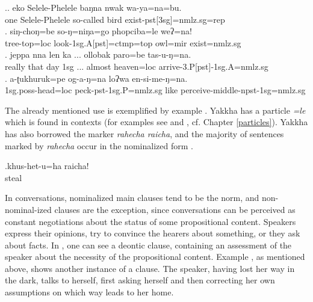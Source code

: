 \ex.\ag.  eko Selele-Phelele baŋna nwak wa-ya=na=bu.\\
one Selele-Phelele so-called bird exist{\sc -pst[3sg]=nmlz.sg=rep}\\
 
\bg. siŋ-choŋ=be        so-ŋ=niŋa=go              phopciba=le          weʔ=na!\\
tree-top{\sc =loc} look{\sc -1sg.A[pst]=ctmp=top} owl{\sc =mir} exist{\sc [3sg.npst]=nmlz.sg}\\
 
\bg. jeppa nna  len ka ... ollobak paro=be tas-u-ŋ=na.\\
really that day {\sc 1sg} ... almost heaven{\sc =loc} arrive{\sc -3.P[pst]-1sg.A=nmlz.sg}\\
 
\bg. a-ʈukhuruk=pe  og-a-ŋ=na loʔwa en-si-me-ŋ=na.\\
{\sc 1sg.poss-}head{\sc =loc} peck{\sc -pst-1sg.P=nmlz.sg} like perceive{\sc -middle-npst-1sg=nmlz.sg}\\
 


The already mentioned  use is exemplified by example \Next. Yakkha has a  particle \emph{=le} which is found in  contexts (for  examples see \Last[b] and \NNext[b], cf. Chapter \ref{particles}). Yakkha has also borrowed the   marker \emph{rahecha \ti raicha}, and the  majority of sentences marked by \emph{rahecha} occur in the nominalized form \Next.


\exg.khus-het-u=ha   raicha!\\
steal  \\
 


In conversations, nominalized main clauses tend to be  the norm, and non-nominal-ized clauses are the exception, since conversations can be perceived as constant negotiations about the status of some propositional content. Speakers express their opinions, try to convince the hearers about something, or they ask about facts. In \Next[a], one can see a deontic clause, containing an assessment of the speaker about the necessity of the propositional content. Example \Next[b], as mentioned above, shows another instance of a  clause. The speaker, having lost her way in the dark, talks to herself, first asking herself and then correcting her own assumptions on which way leads to her home. 

